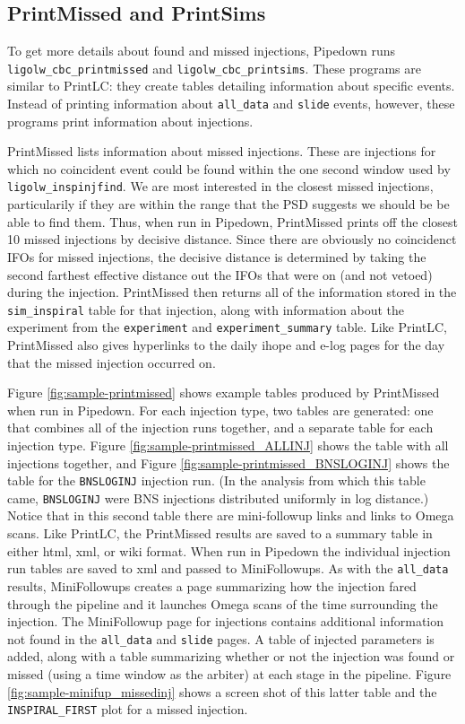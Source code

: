 \subsection{PrintMissed and PrintSims}

To get more details about found and missed injections, Pipedown runs \verb|ligolw_cbc_printmissed| and \verb|ligolw_cbc_printsims|. These programs are similar to PrintLC: they create tables detailing information about specific events. Instead of printing information about \verb|all_data| and \verb|slide| events, however, these programs print information about injections.

PrintMissed lists information about missed injections. These are injections for which no coincident event could be found within the one second window used by \verb|ligolw_inspinjfind|. We are most interested in the closest missed injections, particularily if they are within the range that the \ac{PSD} suggests we should be be able to find them. Thus, when run in Pipedown, PrintMissed prints off the closest 10 missed injections by decisive distance. Since there are obviously no coincidenct \acp{IFO} for missed injections, the decisive distance is determined by taking the second farthest effective distance out the \acp{IFO} that were on (and not vetoed) during the injection. PrintMissed then returns all of the information stored in the \verb|sim_inspiral| table for that injection, along with information about the experiment from the \verb|experiment| and \verb|experiment_summary| table. Like PrintLC, PrintMissed also gives hyperlinks to the daily ihope and e-log pages for the day that the missed injection occurred on. 

Figure \ref{fig:sample-printmissed} shows example tables produced by PrintMissed when run in Pipedown. For each injection type, two tables are generated: one that combines all of the injection runs together, and a separate table for each injection type. Figure \ref{fig:sample-printmissed_ALLINJ} shows the table with all injections together, and Figure \ref{fig:sample-printmissed_BNSLOGINJ} shows the table for the \verb|BNSLOGINJ| injection run. (In the analysis from which this table came, \texttt{BNSLOGINJ} were \ac{BNS} injections distributed uniformly in log distance.) Notice that in this second table there are mini-followup links and links to Omega scans. Like PrintLC, the PrintMissed results are saved to a summary table in either html, xml, or wiki format. When run in Pipedown the individual injection run tables are saved to xml and passed to MiniFollowups. As with the \verb|all_data| results, MiniFollowups creates a page summarizing how the injection fared through the pipeline and it launches Omega scans of the time surrounding the injection. The MiniFollowup page for injections contains additional information not found in the \verb|all_data| and \verb|slide| pages. A table of injected parameters is added, along with a table summarizing whether or not the injection was found or missed (using a time window as the arbiter) at each stage in the pipeline. Figure \ref{fig:sample-minifup_missedinj} shows a screen shot of this latter table and the \verb|INSPIRAL_FIRST| plot for a missed injection.

